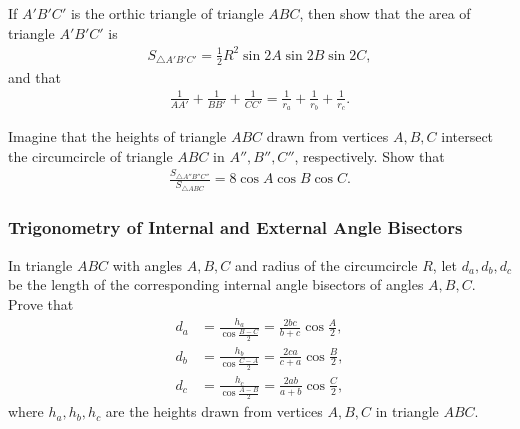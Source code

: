 \documentclass[12pt,a4paper]{memoir}
\theoremstyle{definition}
\begin{document}
\begin{question}
	If $A'B'C'$ is the orthic triangle of triangle $ABC$, then show that the area of triangle $A'B'C'$ is
	\begin{align*}
		S_{\triangle A'B'C'} = \frac{1}{2} R^2 \sin 2A \sin 2B \sin 2C,
	\end{align*}
	and that
	\begin{align*}
		\frac{1}{AA'} + \frac{1}{BB'} + \frac{1}{CC'} = \frac{1}{r_a} + \frac{1}{r_b} + \frac{1}{r_c}.
	\end{align*}
\end{question}


\begin{question}
	Imagine that the heights of triangle $ABC$ drawn from vertices $A,B,C$ intersect the circumcircle of triangle $ABC$ in $A'', B'', C''$, respectively. Show that
	\begin{align*}
		\displaystyle \frac{S_{\triangle A''B''C''}}{S_{\triangle ABC}} = 8\cos A \cos B \cos C.
	\end{align*}
\end{question}



\subsubsection{Trigonometry of Internal and External Angle Bisectors}


	\begin{question}[name=Calculating the Length of Internal Angle Bisectors]
		In triangle $ABC$ with angles $A,B,C$ and radius of the circumcircle $R$, let $d_a,d_b,d_c$ be the length of the corresponding internal angle bisectors of angles $A,B,C$. Prove that
		\begin{align*}
			d_a &=\displaystyle \frac{h_a}{\displaystyle\cos\frac{B-C}{2}} = \frac{2bc}{b+c}\cos\frac{A}{2},\\
			d_b &=\displaystyle \frac{h_b}{\displaystyle\cos\frac{C-A}{2}}= \frac{2ca}{c+a}\cos\frac{B}{2},\\
			d_c &=\displaystyle \frac{h_c}{\displaystyle\cos\frac{A-B}{2}}= \frac{2ab}{a+b}\cos\frac{C}{2},
		\end{align*}
		where $h_a,h_b,h_c$ are the heights drawn from vertices $A,B,C$ in triangle $ABC$.
	\end{question}
\end{document}
